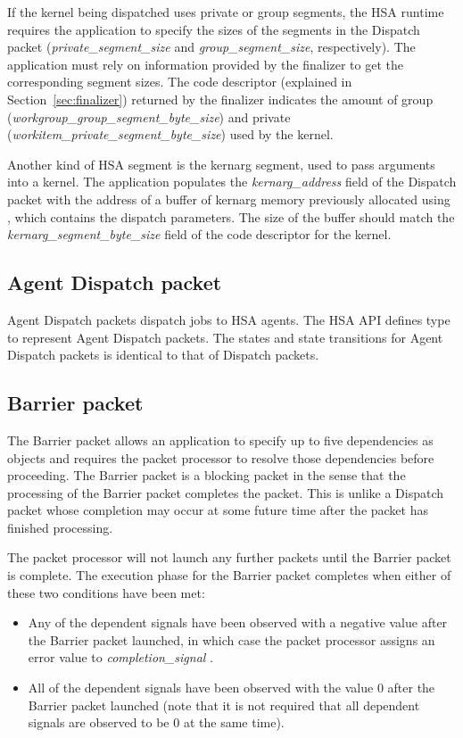 \documentclass[final]{book}
\newcommand{\reffld}[1]{\textit{#1}}
\begin{document}
If the kernel being dispatched uses private or group segments, the HSA runtime
requires the application to specify the sizes of the segments in the Dispatch
packet (\reffld{private_segment_size} and \reffld{group_segment_size},
respectively). The application must rely on information provided by the
finalizer to get the corresponding segment sizes. The code descriptor (explained
in Section~\ref{sec:finalizer}) returned by the finalizer indicates the amount
of group (\reffld{workgroup_group_segment_byte_size}) and private
(\reffld{workitem_private_segment_byte_size}) used by the kernel.

Another kind of HSA segment is the kernarg segment, used to pass arguments into
a kernel. The application populates the \reffld{kernarg_address} field of the
Dispatch packet with the address of a buffer of kernarg memory previously
allocated using , which contains the dispatch
parameters. The size of the buffer should match the
\reffld{kernarg_segment_byte_size} field of the code descriptor for the kernel.

\subsection{Agent Dispatch packet}\label{agent-packet}

Agent Dispatch packets dispatch jobs to HSA agents. The HSA API defines type
 to represent Agent Dispatch packets.
The states and state transitions for Agent Dispatch packets is identical to that
of Dispatch packets.

\subsection{Barrier packet}\label{barrier-packet}

The Barrier packet  allows an application to
specify up to five dependencies as  objects and
requires the packet processor to resolve those dependencies before proceeding.
The Barrier packet is a blocking packet in the sense that the processing of the
Barrier packet completes the packet. This is unlike a Dispatch packet whose
completion may occur at some future time after the packet has finished
processing.

The packet processor will not launch any further packets until the Barrier
packet is complete. The execution phase for the Barrier packet completes when
either of these two conditions have been met:
\begin{itemize}
\item Any of the dependent signals have been observed with a negative value
  after the Barrier packet launched, in which case the packet
  processor assigns an error value to \reffld{completion_signal} .
\item All of the dependent signals have been observed with the value 0 after
  the Barrier packet launched (note that it is not required that all dependent
  signals are observed to be 0 at the same time).
\end{itemize}
\end{document}
